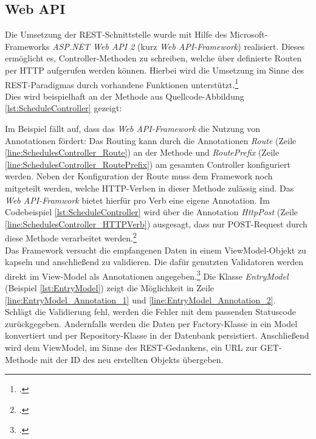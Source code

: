 \subsection{Web API}
\label{ssec:aufbau-webapi}
Die Umsetzung der \ac{REST}-Schnittstelle wurde mit Hilfe des Microsoft-Frameworks \textit{ASP.NET Web API 2} (kurz \textit{Web \ac{API}-Framework}) realisiert. Dieses ermöglicht es, Controller-Methoden zu schreiben, welche über definierte Routen per HTTP aufgerufen werden können. Hierbei wird die Umsetzung im Sinne des \ac{REST}-Paradigmas durch vorhandene Funktionen unterstützt.\footcite[S. 2ff.]{Building-a-REST-Service}\\
Dies wird beispielhaft an der Methode aus  Quellcode-Abbildung \ref{lst:ScheduleController} gezeigt:

Im Beispiel fällt auf, dass das \textit{Web \ac{API}-Framework} die Nutzung von Annotationen fördert: Das Routing kann durch die Annotationen \textit{Route} (Zeile \ref{line:SchedulesController_Route}) an der Methode und \textit{RoutePrefix} (Zeile \ref{line:SchedulesController_RoutePrefix}) am gesamten Controller konfiguriert werden. Neben der Konfiguration der Route muss dem Framework noch mitgeteilt werden, welche \ac{HTTP}-Verben in dieser Methode zulässig sind. Das \textit{Web \ac{API}-Framwork} bietet hierfür pro Verb eine eigene Annotation. Im Codebeispiel \ref{lst:ScheduleController} wird über die Annotation \textit{HttpPost} (Zeile \ref{line:SchedulesController_HTTPVerb}) ausgesagt, dass nur POST-Request durch diese Methode verarbeitet werden.\footcite{webApi-AttributeRouting} \\
Das Framework versucht die empfangenen Daten in einem ViewModel-Objekt zu kapseln und anschließend zu validieren. Die dafür genutzten Validatoren werden direkt im View-Model als Annotationen angegeben.\footcite{webApi-Validation} Die Klasse \textit{EntryModel} (Beispiel \ref{lst:EntryModel}) zeigt die Möglichkeit in Zeile \ref{line:EntryModel_Annotation_1} und \ref{line:EntryModel_Annotation_2}. \\ 

Schlägt die Validierung fehl, werden die Fehler mit dem passenden Statuscode zurückgegeben. Andernfalls werden die Daten per \gls{Factory}-Klasse in ein Model konvertiert und per \gls{Repository}-Klasse in der Datenbank persistiert. Anschließend wird dem ViewModel, im Sinne des \ac{REST}-Gedankens, ein URL zur GET-Methode mit der ID des neu erstellten Objekts übergeben. 
